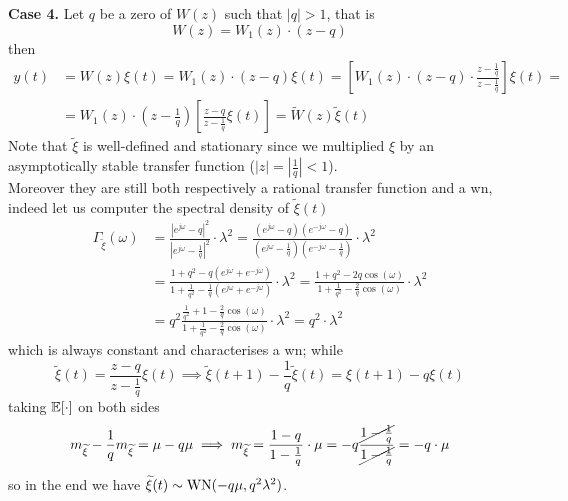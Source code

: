 \textbf{Case 4.}
Let $q$ be a zero of $W(z)$ such that $|q|>1$, that is
\[
	W(z)=W_{1}(z)\cdot(z-q)
\]
then
\begin{align*}
	y(t)&=W(z) \xi(t)=W_{1}(z) \cdot(z-q) \xi(t)=\left[W_{1}(z) \cdot(z-q) \cdot \frac{z-\frac{1}{q}}{z-\frac{1}{q}}\right] \xi(t)= \\
	&=W_{1}(z) \cdot\left(z-\frac{1}{q}\right)\left[\frac{z-q}{z-\frac{1}{q}} \xi(t)\right]=\tilde{W}(z) \tilde{\xi}(t)
\end{align*}
Note that $\tilde{\xi}$ is well-defined and stationary since we multiplied $\xi$ by an asymptotically stable transfer function ($|z|=\left|\frac{1}{q}\right|<1$).\\
Moreover they are still both respectively a rational transfer function and a \gls{wn}, indeed let us computer the spectral density of $\tilde{\xi}(t)$
\begin{align*}
	\Gamma_{\tilde\xi}(\omega) &=\frac{\left|e^{j \omega}-q\right|^{2}}{\left|e^{j \omega}-\frac{1}{q}\right|^{2}} \cdot \lambda^{2}=\frac{\left(e^{j \omega}-q\right)\left(e^{-j \omega}-q\right)}{\left(e^{j \omega}-\frac{1}{q}\right)\left(e^{-j \omega}-\frac{1}{q}\right)} \cdot \lambda^{2}\\
	&=\frac{1+q^{2}-q\left(e^{j \omega}+e^{-j \omega}\right)}{1+\frac{1}{q^{2}}-\frac{1}{q}\left(e^{j \omega}+e^{-j \omega}\right)} \cdot \lambda^{2}=\frac{1+q^{2}-2 q \cos (\omega)}{1+\frac{1}{q^{2}}-\frac{2}{q} \cos (\omega)} \cdot \lambda^{2}\\
	&=q^{2} \frac{\frac{1}{q^{2}}+1-\frac{2}{q} \cos (\omega)}{1+\frac{1}{q^{2}}-\frac{2}{q} \cos (\omega)} \cdot \lambda^{2}=q^{2} \cdot \lambda^{2}
\end{align*}
which is always constant and characterises a \gls{wn}; while
\[
	\tilde \xi(t) = \frac{z-q}{z-\frac{1}{q}} \xi(t) \implies \tilde \xi(t+1)-\frac{1}{q}\tilde \xi(t)=\xi(t+1)-q\xi(t)
\]
taking $\E[\cdot]$ on both sides
\[
	m_{\tilde\xi} - \frac{1}{q} m_{\tilde\xi} = \mu - q\mu \implies m_{\tilde\xi} = \frac{1-q}{1-\frac{1}{q}} \cdot \mu = -q \frac{\cancel{1-\frac{1}{q}}}{\cancel{1-\frac{1}{q}}}=  - q \cdot \mu
\]
so in the end we have $\tilde\xi(t)\sim \WN(-q\mu,q^2 \lambda^2 )$.